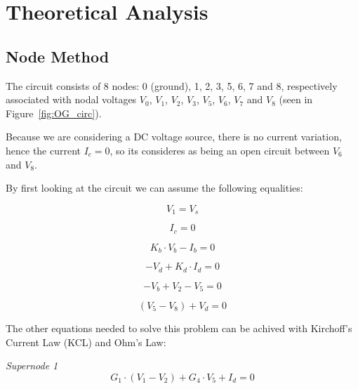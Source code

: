 \section{Theoretical Analysis}
\label{sec:analysis}

\subsection{Node Method}
\label{subsec:node}


The circuit consists of 8 nodes: 0 (ground), 1, 2, 3, 5, 6, 7 and 8, respectively associated with nodal voltages $V_0$, $V_1$, $V_2$, $V_3$, $V_5$, $V_6$, $V_7$ and $V_8$ (seen in Figure~\ref{fig:OG_circ}). 


Because we are considering a DC voltage source, there is no current variation, hence the current $I_c=0$, so its consideres as being an open circuit between $V_6$ and $V_8$.

By first looking at the circuit we can assume the following equalities:


\begin{equation}
  V_1=V_s
  \label{eq:N_1}
\end{equation}


\begin{equation}
    I_c=0
    \label{eq:aux}
\end{equation}


\begin{equation}
    K_b\cdot V_b - I_b =0
    \label{eq:aux1}
\end{equation}


\begin{equation}
    - V_d + K_d \cdot I_d = 0
    \label{eq:aux2}
\end{equation}


\begin{equation}
    -V_b + V_2 - V_5 = 0
    \label{}
\end{equation}

 \begin{equation}
     (V_5-V_8) + V_d=0
 \end{equation}





The other equations needed to solve this problem can be achived with Kirchoff's Current Law (KCL) and Ohm's Law:

\textit{Supernode 1}
\begin{equation}
    G_1 \cdot (V_1 - V_2) + G_4 \cdot V_5 +I_d=0
 \end{equation}
 


